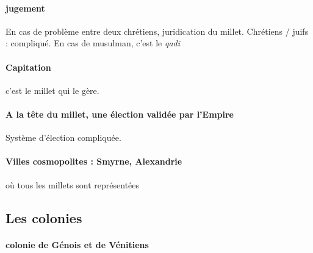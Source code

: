 \paragraph{jugement} En cas de problème entre deux chrétiens, juridication du millet. Chrétiens / juifs : compliqué. En cas de musulman, c'est le \textit{qadi}

\paragraph{Capitation} c'est le millet qui le gère. 

\paragraph{A la tête du millet, une élection validée par l'Empire} Système d'élection compliquée. 


\paragraph{Villes cosmopolites : Smyrne, Alexandrie} où tous les millets sont représentées

\subsection{Les colonies}

\paragraph{colonie de Génois et de Vénitiens} 

